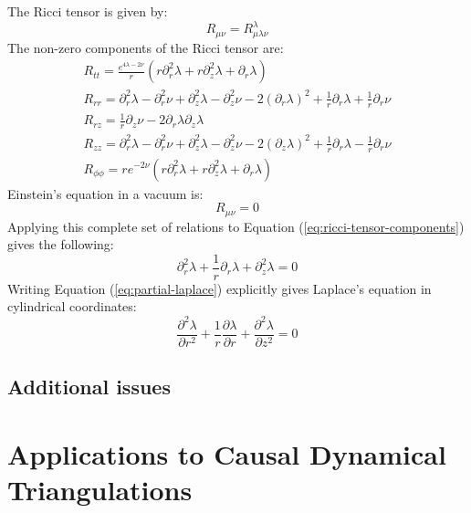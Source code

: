\documentclass{article}
\begin{document}
The Ricci tensor is given by:
\begin{equation}
R_{\mu\nu}=R_{\mu\lambda\nu}^{\lambda}
\end{equation}
The non-zero components of the Ricci tensor are:
\begin{equation}
\begin{array}{l}
R_{tt}=\frac{e^{4\lambda-2\nu}}{r}\left(r\partial^{2}_{r}\lambda+r\partial^{2}_{z}\lambda+\partial_{r}\lambda\right)\\
R_{rr}=\partial^{2}_{r}\lambda-\partial^{2}_{r}\nu+\partial^{2}_{z}\lambda-\partial^{2}_{z}\nu-2\left(\partial_{r}\lambda\right)^{2}+\frac{1}{r}\partial_{r}\lambda+\frac{1}{r}\partial_{r}\nu\\
R_{rz}=\frac{1}{r}\partial_{z}\nu-2\partial_{r}\lambda\partial_{z}\lambda\\
R_{zz}=\partial^{2}_{r}\lambda-\partial^{2}_{r}\nu+\partial^{2}_{z}\lambda-\partial^{2}_{z}\nu-2\left(\partial_{z}\lambda\right)^{2}+\frac{1}{r}\partial_{r}\lambda-\frac{1}{r}\partial_{r}\nu\\
R_{\phi\phi}=re^{-2\nu}\left(r\partial^{2}_{r}\lambda+r\partial^{2}_{z}\lambda+\partial_{r}\lambda\right)
\end{array}\label{eq:ricci-tensor-components}
\end{equation}
Einstein's equation in a vacuum is:
\begin{equation}
R_{\mu\nu}=0\label{eq:vacuum-solutions}
\end{equation}
Applying this complete set of relations to Equation (\ref{eq:ricci-tensor-components}) gives the following:
\begin{equation}
\partial^{2}_{r}\lambda+\frac{1}{r}\partial_{r}\lambda+\partial^{2}_{z}\lambda=0\label{eq:partial-laplace}
\end{equation}
Writing Equation (\ref{eq:partial-laplace}) explicitly gives Laplace's equation in cylindrical coordinates:
\begin{equation}
\frac{\partial^{2}\lambda}{\partial r^{2}}+\frac{1}{r}\frac{\partial\lambda}{\partial r}+\frac{\partial^{2}\lambda}{\partial z^{2}}=0
\end{equation}
\subsection{Additional issues}



\section{Applications to Causal Dynamical Triangulations}
\end{document}
